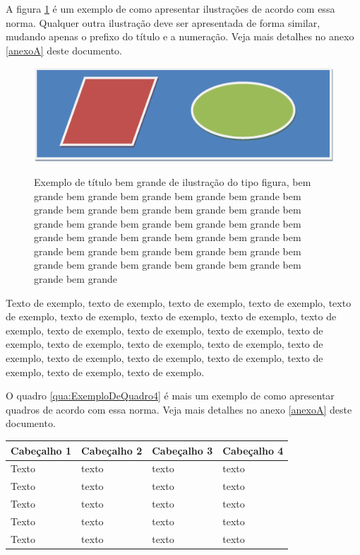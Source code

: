 \documentclass[
	12pt,				%
	oneside,			%
	a4paper,			%
	english,			%
	brazil				%
	]{abntex2ppgsi}
\begin{document}
A figura \ref{fig:figura-exemplo4} é um exemplo de como apresentar ilustrações de acordo com essa norma. Qualquer outra ilustração deve ser apresentada de forma similar, mudando apenas o prefixo do título e a numeração. Veja mais detalhes no anexo \ref{anexoA} deste documento.

\begin{figure}[htbp]
	\centering
	\caption{Exemplo de título bem grande de ilustração do tipo figura, bem grande bem grande bem grande bem grande bem grande bem grande bem grande bem grande bem grande bem grande bem grande bem grande bem grande bem grande bem grande bem grande bem grande bem grande bem grande bem grande bem grande bem grande bem grande bem grande bem grande bem grande bem grande bem grande bem grande bem grande bem grande bem grande}
		\includegraphics{figura-exemplo.png}
	\label{fig:figura-exemplo4}
\end{figure}

Texto de exemplo, texto de exemplo, texto de exemplo, texto de exemplo, texto de exemplo, texto de exemplo, texto de exemplo, texto de exemplo, texto de exemplo, texto de exemplo, texto de exemplo, texto de exemplo, texto de exemplo, texto de exemplo, texto de exemplo, texto de exemplo, texto de exemplo, texto de exemplo, texto de exemplo, texto de exemplo, texto de exemplo, texto de exemplo, texto de exemplo.

O quadro \ref{qua:ExemploDeQuadro4} é mais um exemplo de como apresentar quadros de acordo com essa norma. Veja mais detalhes no anexo \ref{anexoA} deste documento.

\begin{quadro}[H]
	\centering
	\caption{Exemplo de título de quadro}
	\begin{tabular}{|p{1in} | p{1in} | p{1in} | p{1in} |} \hline
		
		Cabeçalho 1	& Cabeçalho 2	& Cabeçalho 3	& Cabeçalho 4 \\ \hline
		Texto	& texto & texto	& texto \\ \hline
		Texto	& texto & texto	& texto \\ \hline
		Texto	& texto & texto	& texto \\ \hline
		Texto	& texto & texto	& texto \\ \hline
		Texto	& texto & texto	& texto \\ \hline
		
	\end{tabular}
	\label{qua:ExemploDeQuadro4}
\end{quadro}
\end{document}
